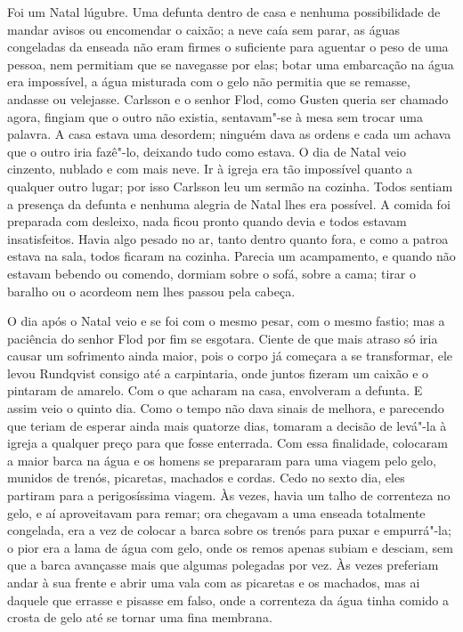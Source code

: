 Foi um Natal lúgubre. Uma defunta dentro de casa e nenhuma possibilidade de
mandar avisos ou encomendar o caixão; a neve caía sem parar, as águas congeladas
da enseada não eram firmes o suficiente para aguentar o peso de uma pessoa, nem
permitiam que se navegasse por elas; botar uma embarcação na água era
impossível, a água misturada com o gelo não permitia que se remasse, andasse ou
velejasse. Carlsson e o senhor Flod, como Gusten queria ser chamado agora,
fingiam que o outro não existia, sentavam"-se à mesa sem trocar uma palavra. A
casa estava uma desordem; ninguém dava as ordens e cada um achava que o outro
iria fazê"-lo, deixando tudo como estava. O dia de Natal veio cinzento, nublado e
com mais neve. Ir à igreja era tão impossível quanto a qualquer outro
lugar; por isso Carlsson leu um sermão na cozinha. Todos sentiam a presença da
defunta e nenhuma alegria de Natal lhes era possível. A comida foi preparada com
desleixo, nada ficou pronto quando devia e todos estavam insatisfeitos. Havia
algo pesado no ar, tanto dentro quanto fora, e como a patroa estava na sala,
todos ficaram na cozinha. Parecia um acampamento, e quando não estavam bebendo
ou comendo, dormiam sobre o sofá, sobre a cama; tirar o baralho ou o acordeom
nem lhes passou pela cabeça.

O dia após o Natal veio e se foi com o mesmo pesar, com o mesmo fastio; mas
a paciência do senhor Flod por fim se esgotara. Ciente de que mais atraso só iria causar
um sofrimento ainda maior, pois o corpo já começara a se transformar, ele levou Rundqvist 
consigo até a carpintaria, onde juntos fizeram um caixão e o pintaram de amarelo. Com o 
que acharam na casa, envolveram a defunta. E assim veio o quinto
dia. Como o tempo não dava sinais de melhora, e parecendo que teriam de esperar
ainda mais quatorze dias, tomaram a decisão de levá"-la à igreja a qualquer preço para 
que fosse enterrada. Com essa finalidade, colocaram a maior barca na
água e os homens se prepararam para uma viagem pelo gelo, munidos de trenós,
picaretas, machados e cordas. Cedo no sexto dia, eles partiram para a
perigosíssima viagem. Às vezes, havia um talho de correnteza no gelo, e aí
aproveitavam para remar; ora chegavam a uma enseada totalmente congelada, era a
vez de colocar a barca sobre os trenós para puxar e empurrá"-la; o pior era a
lama de água com gelo, onde os remos apenas subiam e desciam, sem que a barca
avançasse mais que algumas polegadas por vez. Às vezes preferiam andar à sua
frente e abrir uma vala com as picaretas e os machados, mas ai daquele que
errasse e pisasse em falso, onde a correnteza da água tinha comido a crosta de
gelo até se tornar uma fina membrana.

